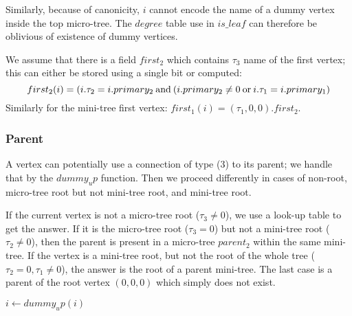 Similarly, because of canonicity, $i$ cannot encode the name of a dummy vertex inside the top micro-tree.
The $degree$ table use in $is\_leaf$ can therefore be oblivious of existence of dummy vertices.

\begin{algorithmic}
	\State {}
\EndFunction
\end{algorithmic}

\begin{algorithmic}
	\State {}
\EndFunction
\end{algorithmic}

We assume that there is a field $first_2$ which contains $\tau_3$ name of the first vertex; this can either be stored using a single bit or computed:
$$first_2(i) = (i.\tau_2 = i.primary_2 \mathbin{\textrm{and}} (i.primary_2 \ne 0 \mathbin{\textrm{or}} i.\tau_1 = i.primary_1)$$
Similarly for the mini-tree first vertex: $first_1(i) = (\tau_1, 0, 0).first_2$.

\subsubsection{Parent}

A vertex can potentially use a connection of type (3) to its parent; we handle that by the $dummy_up$ function.
Then we proceed differently in cases of non-root, micro-tree root but not mini-tree root, and mini-tree root.

If the current vertex is not a micro-tree root ($\tau_3 \ne 0$), we use a look-up table to get the answer.
If it is the micro-tree root ($\tau_3 = 0$) but not a mini-tree root ($\tau_2 \ne 0$), then the parent is present in a micro-tree $parent_2$ within the same mini-tree.
If the vertex is a mini-tree root, but not the root of the whole tree ($\tau_2 = 0, \tau_1 \ne 0$), the answer is the root of a parent mini-tree.
The last case is a parent of the root vertex $(0, 0, 0)$ which simply does not exist.

\begin{algorithmic}
	\State $i \gets dummy_up(i)$
		\State {}
		\State {}
		\State {}
	\Else
		\State {}
	\EndIf
\EndFunction
\end{algorithmic}

